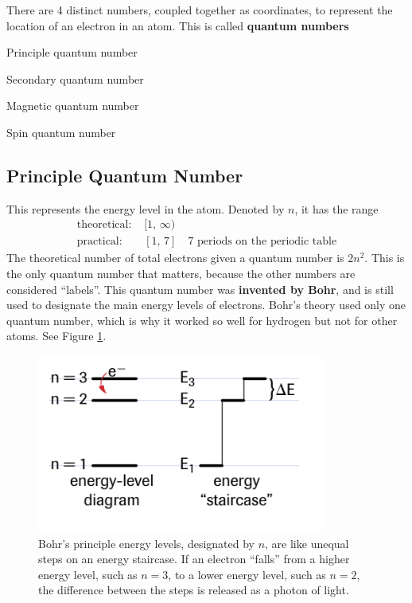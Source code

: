 
There are 4 distinct numbers, coupled together as coordinates, to represent the location of
an electron in an atom. This is called \textbf{quantum numbers}
\begin{enum}
    \item Principle quantum number
    \item Secondary quantum number
    \item Magnetic quantum number
    \item Spin quantum number
\end{enum}

\subsection{Principle Quantum Number}
This represents the energy level in the atom. Denoted by $n$, it has the range
    \begin{align*}
        \text{theoretical: }&[1,\,\infty)\\
        \text{practical: }&[1,\,7]\quad\text{7 periods on the periodic table}
    \end{align*}
The theoretical number of total electrons given a quantum number is $2n^2$. This is the 
only quantum number that matters, because the other numbers are considered ``labels''. 
This quantum number was \textbf{invented by Bohr}, and is still used to designate the main energy
levels of electrons. Bohr's theory used only one quantum number, which is why it worked so well
for hydrogen but not for other atoms. See Figure \ref{fig:bohr-model-quantum-numbers}.

\begin{figure}[ht!]
    \centering
    \includegraphics[width=0.4 \textwidth]{../figures/bohr-model-quantum-numbers.png}
    \caption{Bohr's principle energy levels, designated by $n$, are
        like unequal steps on an energy staircase. If an electron ``falls'' from a higher energy level,
        such as $n=3$, to a lower energy level, such as $n=2$, the difference between the steps is
        released as a photon of light.}
    \label{fig:bohr-model-quantum-numbers}
\end{figure}

